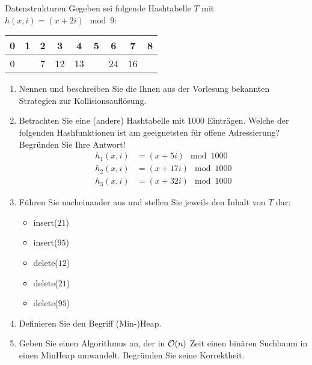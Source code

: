 \documentclass{article}
\begin{document}
\begin{exercise}{Datenstrukturen}
  Gegeben sei folgende Hashtabelle $T$ mit $h(x, i) = (x + 2i) \mod 9$:
  \begin{tabular}{c|c|c|c|c|c|c|c|c}
    0 & 1 & 2 & 3  & 4  & 5 & 6  & 7  & 8 \\
    \hline
    0 &   & 7 & 12 & 13 &   & 24 & 16 &   \\
  \end{tabular}
  \begin{enumerate}
    \item Nennen und beschreiben Sie die Ihnen aus der Vorlesung bekannten Strategien zur Kollisionsauflösung.
    \item Betrachten Sie eine (andere) Hashtabelle mit 1000 Einträgen. Welche der folgenden Hashfunktionen ist am geeignetsten für offene Adressierung? Begründen Sie Ihre Antwort!
          \begin{align*}
            h_1(x, i) & = (x + 5i) \mod 1000  \\
            h_2(x, i) & = (x + 17i) \mod 1000 \\
            h_3(x, i) & = (x + 32i) \mod 1000
          \end{align*}
    \item Führen Sie nacheinander aus und stellen Sie jeweils den Inhalt von $T$ dar:
          \begin{itemize}
            \item insert($21$)
            \item insert($95$)
            \item delete($12$)
            \item delete($21$)
            \item delete($95$)
          \end{itemize}
    \item Definieren Sie den Begriff (Min-)Heap.
    \item Geben Sie einen Algorithmus an, der in $\mathcal{O}(n)$ Zeit einen binären Suchbaum in einen MinHeap umwandelt. Begründen Sie seine Korrektheit.
  \end{enumerate}


\end{exercise}
\end{document}
